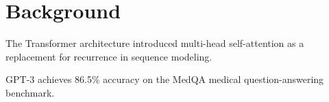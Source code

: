\section{Background}

The Transformer architecture introduced multi-head self-attention as a
replacement for recurrence in sequence modeling.

%
%
GPT-3 achieves 86.5\% accuracy on the MedQA medical question-answering
benchmark.
